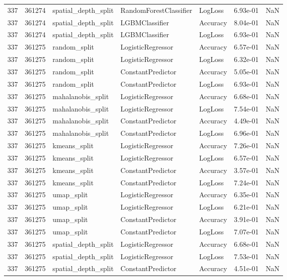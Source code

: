 \begin{tabular}{rrlllrr}
337 & 361274 & spatial\_depth\_split & RandomForestClassifier & LogLoss & 6.93e-01 & NaN \\
337 & 361274 & spatial\_depth\_split & LGBMClassifier & Accuracy & 8.04e-01 & NaN \\
337 & 361274 & spatial\_depth\_split & LGBMClassifier & LogLoss & 6.93e-01 & NaN \\
337 & 361275 & random\_split & LogisticRegressor & Accuracy & 6.57e-01 & NaN \\
337 & 361275 & random\_split & LogisticRegressor & LogLoss & 6.32e-01 & NaN \\
337 & 361275 & random\_split & ConstantPredictor & Accuracy & 5.05e-01 & NaN \\
337 & 361275 & random\_split & ConstantPredictor & LogLoss & 6.93e-01 & NaN \\
337 & 361275 & mahalanobis\_split & LogisticRegressor & Accuracy & 6.68e-01 & NaN \\
337 & 361275 & mahalanobis\_split & LogisticRegressor & LogLoss & 7.54e-01 & NaN \\
337 & 361275 & mahalanobis\_split & ConstantPredictor & Accuracy & 4.49e-01 & NaN \\
337 & 361275 & mahalanobis\_split & ConstantPredictor & LogLoss & 6.96e-01 & NaN \\
337 & 361275 & kmeans\_split & LogisticRegressor & Accuracy & 7.26e-01 & NaN \\
337 & 361275 & kmeans\_split & LogisticRegressor & LogLoss & 6.57e-01 & NaN \\
337 & 361275 & kmeans\_split & ConstantPredictor & Accuracy & 3.57e-01 & NaN \\
337 & 361275 & kmeans\_split & ConstantPredictor & LogLoss & 7.24e-01 & NaN \\
337 & 361275 & umap\_split & LogisticRegressor & Accuracy & 6.35e-01 & NaN \\
337 & 361275 & umap\_split & LogisticRegressor & LogLoss & 6.21e-01 & NaN \\
337 & 361275 & umap\_split & ConstantPredictor & Accuracy & 3.91e-01 & NaN \\
337 & 361275 & umap\_split & ConstantPredictor & LogLoss & 7.07e-01 & NaN \\
337 & 361275 & spatial\_depth\_split & LogisticRegressor & Accuracy & 6.68e-01 & NaN \\
337 & 361275 & spatial\_depth\_split & LogisticRegressor & LogLoss & 7.53e-01 & NaN \\
337 & 361275 & spatial\_depth\_split & ConstantPredictor & Accuracy & 4.51e-01 & NaN \\

\end{tabular}
